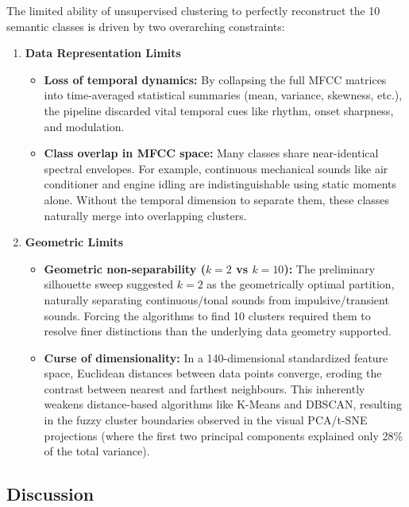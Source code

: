 \documentclass[runningheads,a4paper,11pt]{report}
\begin{document}
The limited ability of unsupervised clustering to perfectly reconstruct the 10 semantic classes is driven by two overarching constraints:

\begin{enumerate}
    \item \textbf{Data Representation Limits}
    \begin{itemize}
        \item \textbf{Loss of temporal dynamics:} By collapsing the full MFCC matrices into time-averaged statistical summaries (mean, variance, skewness, etc.), the pipeline discarded vital temporal cues like rhythm, onset sharpness, and modulation.
        \item \textbf{Class overlap in MFCC space:} Many classes share near-identical spectral envelopes. For example, continuous mechanical sounds like air conditioner and engine idling are indistinguishable using static moments alone. Without the temporal dimension to separate them, these classes naturally merge into overlapping clusters.
    \end{itemize}

    \item \textbf{Geometric Limits}
    \begin{itemize}
        \item \textbf{Geometric non-separability ($k=2$ vs $k=10$):} The preliminary silhouette sweep suggested $k=2$ as the geometrically optimal partition, naturally separating continuous/tonal sounds from impulsive/transient sounds. Forcing the algorithms to find 10 clusters required them to resolve finer distinctions than the underlying data geometry supported.
        \item \textbf{Curse of dimensionality:} In a 140-dimensional standardized feature space, Euclidean distances between data points converge, eroding the contrast between nearest and farthest neighbours. This inherently weakens distance-based algorithms like K-Means and DBSCAN, resulting in the fuzzy cluster boundaries observed in the visual PCA/t-SNE projections (where the first two principal components explained only 28\% of the total variance).
    \end{itemize}
\end{enumerate}




\subsection{Discussion}
\label{section:discussion}
\end{document}
